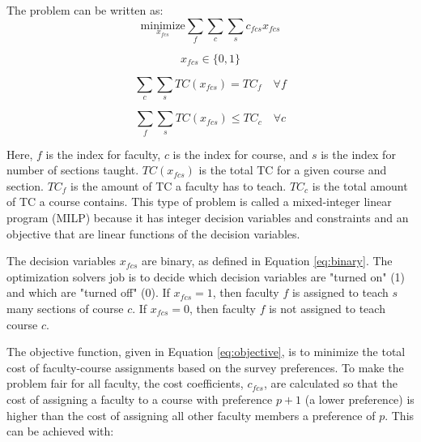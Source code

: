 \documentclass{article}
\begin{document}
    The problem can be written as: \\
    
    \begin{equation}
        \underset{x_{fcs}}{\text{minimize}} \sum_{f} \sum_{c} \sum_{s} c_{fcs} x_{fcs}
        \label{eq:objective}
    \end{equation}
    

    \begin{equation}
        x_{fcs} \in \{0, 1\} 
        \label{eq:binary}
    \end{equation}

    \begin{equation}
        \sum_{c} \sum_{s} TC(x_{fcs}) = TC_f \quad \forall f
        \label{eq:constraint1}
    \end{equation}

    \begin{equation}
        \sum_{f} \sum_{s} TC(x_{fcs}) \leq TC_c \quad \forall c
        \label{eq:constraint2}
    \end{equation}


    Here, $f$ is the index for faculty, $c$ is the index for course, and $s$ is the index for number of sections taught.
    $TC(x_{fcs})$ is the total TC for a given course and section.
    $TC_f$ is the amount of TC a faculty has to teach.
    $TC_c$ is the total amount of TC a course contains.
    This type of problem is called a mixed-integer linear program (MILP) because it has integer decision variables and constraints
     and an objective that are linear functions of the decision variables.

    The decision variables $x_{fcs}$ are binary, as defined in Equation \eqref{eq:binary}. 
    The optimization solvers job is to decide which decision variables are "turned on" (1) and which are "turned off" (0).
    If $x_{fcs} = 1$, then faculty $f$ is assigned to teach $s$ many sections of course $c$.
    If $x_{fcs} = 0$, then faculty $f$ is not assigned to teach course $c$.

    The objective function, given in Equation \eqref{eq:objective}, is to minimize the total cost of faculty-course assignments based on the survey preferences.
    To make the problem fair for all faculty, the cost coefficients, $c_{fcs}$, are calculated so that the cost of assigning 
    a faculty to a course with preference $p + 1$ (a lower preference) is higher than the cost of assigning all other faculty members 
    a preference of $p$. This can be achieved with:
\end{document}

